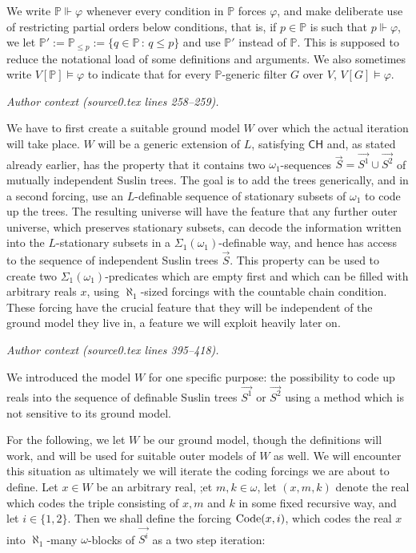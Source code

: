 \documentclass[10pt,a4paper]{amsart}
\newcommand{\CH}{\mathsf{CH}}
\newcommand{\forceP}{\mathbb{P}}
\begin{document}
We write $\forceP \Vdash \varphi$ whenever every condition in $\forceP$ forces $\varphi$, and make deliberate use of restricting partial orders below conditions, that is, if $p \in \forceP $ is such that $p \Vdash \varphi$, we let $\forceP':= \forceP_{\le p}:=\{ q \in \forceP \, : \, q \le p\}$ and use $\forceP'$ instead of $\forceP$. This is supposed to reduce the notational load of some definitions and arguments.
We also sometimes write $V[\forceP]\models \varphi$ to indicate that for every $\forceP$-generic filter $G$ over $V$, $V[G] \models \varphi$.
\par\medskip\noindent\textit{Author context (source0.tex lines 258--259).}\par\smallskip
We have to first create a suitable ground model $W$ over which the actual iteration will take place. $W$ will be a generic extension of $L$, satisfying $\CH$ and, as stated already earlier, has the property that it contains two $\omega_1$-sequences $\vec{S}=\vec{S^1} \cup \vec{S^2}$ of mutually independent Suslin trees. 
The goal is to add the trees generically, and in a second forcing, use an $L$-definable sequence of stationary subsets of $\omega_1$ to code up the trees. The resulting universe will have the feature that any further outer universe, which preserves stationary subsets, can decode the information written into the $L$-stationary subsets in a $\Sigma_1(\omega_1)$-definable way, and hence has access to the sequence of independent Suslin trees $\vec{S}$. This property can be used to create two $\Sigma_1(\omega_1)$-predicates which are empty first and which can be filled with arbitrary reals $x$, using $\aleph_1$-sized forcings with the countable chain condition. These forcing have the crucial feature that they will be independent of the ground model they live in, a feature we will exploit heavily later on.
\par\medskip\noindent\textit{Author context (source0.tex lines 395--418).}\par\smallskip
We introduced the model $W$ for one specific purpose: the possibility to code up reals into the sequence of definable Suslin trees $\vec{S^1}$ or $\vec{S^2}$ using a method which is not sensitive to its ground model.

For the following, we let $W$ be our ground model, though the definitions will work, and will be used for suitable outer models of $W$ as well. We will encounter this situation as ultimately we will iterate the coding forcings we are about to define.
Let $x \in W$  be an arbitrary real, ;et $m,k \in \omega$, let $(x,m,k)$ denote the real which codes the triple consisting of $x,m$ and $k$ in some fixed recursive way, and let $i \in \{ 1,2\}$. Then we shall define the forcing $\hbox{Code}(x,i)$, which codes the real $x$ into $\aleph_1$-many $\omega$-blocks of $\vec{S^i}$ as a two step iteration:
\end{document}
